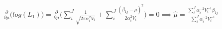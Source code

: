 \begin{multline}
\frac{\partial}{\partial \mu}\Big(log(L_1)\Big) =
\frac{\partial}{\partial \mu} \Big(\sum\limits_i^J \frac{1}{\sqrt{2 \pi \alpha_i^2 V_i}} + \sum\limits_i^J \frac{(\beta_{1j} - \mu)^2}{2 \alpha_i^2V_i}\Big) = 0
\implies \hat{\mu} = \frac{\sum\limits_i^J \alpha_i^{-2}V_i^{-1}\beta_{1j}}{\sum\limits_i^J \alpha_i^{-2}V_i^{-1}}
\end{multline}